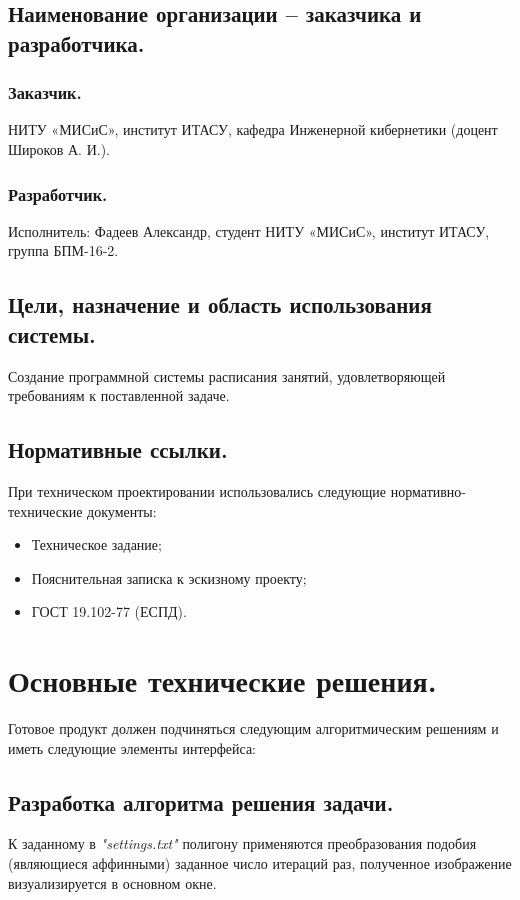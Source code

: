\documentclass[a4paper,12pt,preview]{report} %
\begin{document}
	\subsection{Наименование организации -- заказчика и разработчика.}
	\subsubsection{Заказчик.}
	НИТУ «МИСиС», институт ИТАСУ, кафедра Инженерной кибернетики (доцент Широков А. И.).
	\subsubsection{Разработчик.}
	Исполнитель: Фадеев Александр, студент НИТУ «МИСиС», институт ИТАСУ, группа БПМ-16-2.
	
	\subsection{Цели, назначение и область использования системы.}
	Создание программной системы расписания занятий, удовлетворяющей требованиям к поставленной задаче.
		
	\subsection{Нормативные ссылки.}
	При техническом проектировании использовались следующие нормативно-технические документы:
	
	\begin{itemize}
		\item Техническое задание;
		\item Пояснительная записка к эскизному проекту;
		\item ГОСТ 19.102-77 (ЕСПД).
	\end{itemize}


		\section{Основные технические решения.}
	
	Готовое продукт должен подчиняться следующим алгоритмическим решениям и иметь следующие элементы интерфейса:
	
	\subsection{Разработка алгоритма решения задачи.}
	
	К заданному в \textit{"settings.txt"} полигону применяются преобразования подобия (являющиеся аффинными) заданное число итераций раз, полученное изображение визуализируется в основном окне.
	
\end{document}
